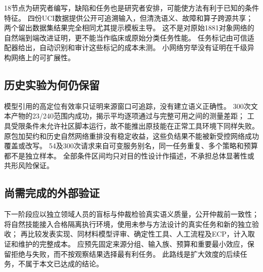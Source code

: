 18节点为研究者编写，缺陷和任务也是研究者安排，可能使方法有利于已知的条件特征。
四份UCI数据提供公开可追溯输入，但清洗语义、故障和算子跨源共享；两个留出数据集结果完全相同尤其提示模板主导。
这不是对原始1881对象网络的自然端到端改进证明，更不能当作临床或原始分类任务性能。
任务标记由可信适配器给出，自动识别和审计这些标记的成本未测。
小网络穷举没有证明在千级异构网络上的可扩展性。

\subsection{历史实验为何仍保留}
模型引用的高定位有效率只证明来源窗口可追踪，没有建立语义正确性。
300次文本产物的23/240范围内成功，揭示平均逐项通过与完整可用之间的测量差距；
工具受限条件未允许社区脚本运行，故不能推出原技能在正常工具环境下同样失败。
原包加契约和历史自然网络重排没有稳定收益，这些负结果不能被新受控网络成功覆盖或改写。
54及300次请求来自可变服务别名，同一任务重复、多个策略和预算都不是独立样本。
全部条件区间均只对目的性设计作描述，不承担总体显著性或共形风险保证。

\subsection{尚需完成的外部验证}
下一阶段应以独立领域人员的盲标与仲裁检验真实语义质量，公开仲裁前一致性；
将自然技能接入合格隔离执行环境，使用未参与方法设计的真实任务和新的独立验收；
再比较发表实现、同材料模型评审、确定性工具、人工流程及ECP，计入取证和维护的完整成本。
应预先固定来源分组、输入族、预算和重要最小效应，保留拒绝与失败，而不按观察结果选择最有利任务。
此路线是扩大效度的后续任务，不属于本文已达成的结论。
